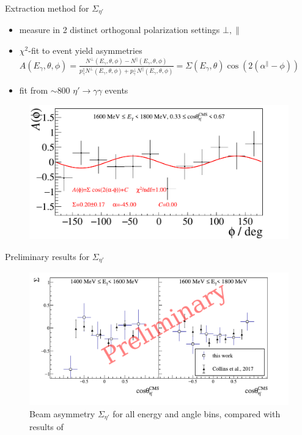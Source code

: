 \documentclass[11pt,aspectratio=169,dvipsnames]{beamer}
\begin{document}
\begin{frame}{Extraction method for $\Sigma_{\eta'}$}

	\begin{itemize}
		\item measure in 2 distinct orthogonal polarization settings $\bot,\parallel$
		\item $\chi^2$-fit to event yield asymmetries $A(E_\gamma,\theta,\phi)=\frac{N^\bot(E_\gamma,\theta,\phi)-N^\parallel(E_\gamma,\theta,\phi)}{p_\gamma^\parallel N^\bot(E_\gamma,\theta,\phi) + p_\gamma^\bot N^\parallel(E_\gamma,\theta,\phi)}=\Sigma(E_\gamma,\theta)\cos\left(2\left(\alpha^\parallel-\phi\right)\right)$
		\item fit from $\sim 800$ $\eta'\to\gamma\gamma$ events
	\end{itemize}
\vspace{-0.1cm}
\begin{figure}
	\centering
	\includegraphics[width=.66\linewidth]{asym_bin}
\end{figure}


\end{frame}





\begin{frame}{Preliminary results for $\Sigma_{\eta'}$}
	\begin{figure}
		\centering
		\includegraphics[width=.99\linewidth]{sigma}
		\caption*{Beam asymmetry $\Sigma_{\eta'}$ for all energy and angle bins, compared with results of \cites{clas}}
	\end{figure}
\end{frame}
\end{document}
